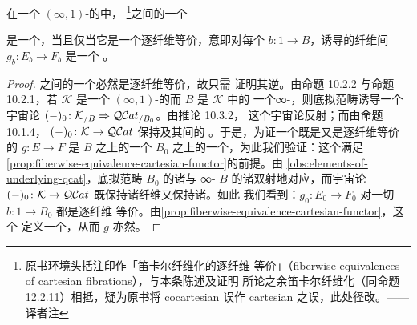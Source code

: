 \begin{proposition}[余笛卡尔纤维化的逐纤维等价]\label{prop:fiberwise-equivalence-cosmos}
在一个 $(\infty,1)$-\trCategory{}的\trInfinityCosmos{}中，%
\trCocartesianFibration\footnote{原书环境头括注印作「笛卡尔纤维化的逐纤维
等价」（fiberwise equivalences of cartesian fibrations），与本条陈述及证明
所论之余笛卡尔纤维化（同命题 12.2.11）相抵，疑为原书将 cocartesian 误作
cartesian 之误，此处径改。——译者注}之间的一个\trCartesianFunctor
\begin{center}
\end{center}
是一个\trFiberedEquivalence，当且仅当它是一个逐纤维等价，意即对每个\trElement{}
$b\colon 1\to B$，诱导的纤维间\trFunctor{} $g_{b}\colon E_{b}\to F_{b}$ 是一个%
\trEquivalence。
\end{proposition}

\begin{proof}
\trCocartesianFibration{}之间的一个\trEquivalence{}必然是逐纤维等价，故只需
证明其逆。由命题 10.2.2 与命题 10.2.1，若 $\mathcal{K}$ 是一个
$(\infty,1)$-\trCategory{}的\trInfinityCosmos{}而 $B$ 是 $\mathcal{K}$ 中的
一个∞-\trCategory，则底拟范畴\trFunctor{}诱导一个宇宙论\trBiequivalence{}
$(-)_{0}\colon\mathcal{K}_{/B}\Rightarrow\mathcal{Q}\mathcal{C}at_{/B_{0}}$。由推论 10.3.2，
这个宇宙论\trBiequivalence{}反射\trEquivalence；而由命题 10.1.4，
$(-)_{0}\colon\mathcal{K}\to\mathcal{Q}\mathcal{C}at$ 保持\trCocartesianFibration{}及其间的%
\trCartesianFunctor。于是，为证一个既是\trCartesianFunctor{}又是逐纤维等价的
$g\colon E\to F$ 是 $B$ 之上的一个\trEquivalence
$B_{0}$ 之上的一个\trEquivalence，为此我们验证：这个\trFunctor{}满足%
\cref{prop:fiberwise-equivalence-cartesian-functor}的前提。由%
\cref{obs:elements-of-underlying-qcat}，底拟范畴 $B_{0}$ 的诸\trElement{}与
∞-\trCategory{} $B$ 的诸\trElement{}双射地对应，而宇宙论\trFunctor{}
$(-)_{0}\colon\mathcal{K}\to\mathcal{Q}\mathcal{C}at$ 既保持诸纤维又保持诸\trEquivalence。如此
我们看到：$g_{0}\colon E_{0}\to F_{0}$ 对一切 $b\colon 1\to B_{0}$ 都是逐纤维
等价。由\cref{prop:fiberwise-equivalence-cartesian-functor}，这个\trFunctor{}%
定义一个\trFiberedEquivalence，从而 $g$ 亦然。
\end{proof}

